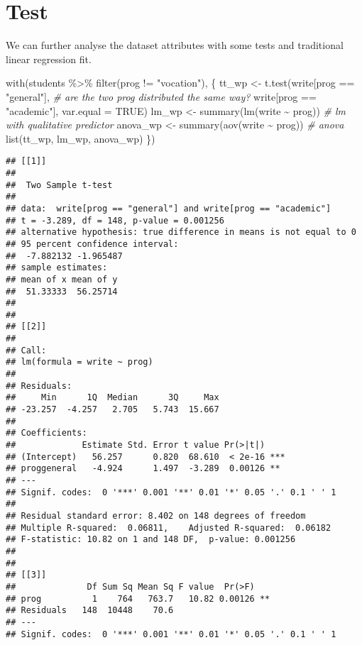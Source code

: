 \documentclass[
  oneside]{book}
\newenvironment{Shaded}{\begin{snugshade}}{\end{snugshade}}
\newcommand{\AttributeTok}[1]{\textcolor[rgb]{0.77,0.63,0.00}{#1}}
\newcommand{\CommentTok}[1]{\textcolor[rgb]{0.56,0.35,0.01}{\textit{#1}}}
\newcommand{\ConstantTok}[1]{\textcolor[rgb]{0.00,0.00,0.00}{#1}}
\newcommand{\FunctionTok}[1]{\textcolor[rgb]{0.00,0.00,0.00}{#1}}
\newcommand{\NormalTok}[1]{#1}
\newcommand{\OtherTok}[1]{\textcolor[rgb]{0.56,0.35,0.01}{#1}}
\newcommand{\SpecialCharTok}[1]{\textcolor[rgb]{0.00,0.00,0.00}{#1}}
\newcommand{\StringTok}[1]{\textcolor[rgb]{0.31,0.60,0.02}{#1}}
\begin{document}
\hypertarget{test}{%
\section{Test}\label{test}}

We can further analyse the dataset attributes with some tests and
traditional linear regression fit.

\begin{Shaded}
\begin{Highlighting}[]
\FunctionTok{with}\NormalTok{(students }\SpecialCharTok{\%\textgreater{}\%} \FunctionTok{filter}\NormalTok{(prog }\SpecialCharTok{!=} \StringTok{"vocation"}\NormalTok{), \{}
\NormalTok{  tt\_wp }\OtherTok{\textless{}{-}} \FunctionTok{t.test}\NormalTok{(write[prog }\SpecialCharTok{==} \StringTok{"general"}\NormalTok{], }\CommentTok{\# are the two prog distributed the same way?}
\NormalTok{         write[prog }\SpecialCharTok{==} \StringTok{"academic"}\NormalTok{], }\AttributeTok{var.equal =} \ConstantTok{TRUE}\NormalTok{)}
\NormalTok{  lm\_wp }\OtherTok{\textless{}{-}} \FunctionTok{summary}\NormalTok{(}\FunctionTok{lm}\NormalTok{(write }\SpecialCharTok{\textasciitilde{}}\NormalTok{ prog)) }\CommentTok{\# lm with qualitative predictor}
\NormalTok{  anova\_wp }\OtherTok{\textless{}{-}} \FunctionTok{summary}\NormalTok{(}\FunctionTok{aov}\NormalTok{(write }\SpecialCharTok{\textasciitilde{}}\NormalTok{ prog)) }\CommentTok{\# anova}
  \FunctionTok{list}\NormalTok{(tt\_wp, lm\_wp, anova\_wp)}
\NormalTok{ \})}
\end{Highlighting}
\end{Shaded}

\begin{verbatim}
## [[1]]
## 
##  Two Sample t-test
## 
## data:  write[prog == "general"] and write[prog == "academic"]
## t = -3.289, df = 148, p-value = 0.001256
## alternative hypothesis: true difference in means is not equal to 0
## 95 percent confidence interval:
##  -7.882132 -1.965487
## sample estimates:
## mean of x mean of y 
##  51.33333  56.25714 
## 
## 
## [[2]]
## 
## Call:
## lm(formula = write ~ prog)
## 
## Residuals:
##     Min      1Q  Median      3Q     Max 
## -23.257  -4.257   2.705   5.743  15.667 
## 
## Coefficients:
##             Estimate Std. Error t value Pr(>|t|)    
## (Intercept)   56.257      0.820  68.610  < 2e-16 ***
## proggeneral   -4.924      1.497  -3.289  0.00126 ** 
## ---
## Signif. codes:  0 '***' 0.001 '**' 0.01 '*' 0.05 '.' 0.1 ' ' 1
## 
## Residual standard error: 8.402 on 148 degrees of freedom
## Multiple R-squared:  0.06811,    Adjusted R-squared:  0.06182 
## F-statistic: 10.82 on 1 and 148 DF,  p-value: 0.001256
## 
## 
## [[3]]
##              Df Sum Sq Mean Sq F value  Pr(>F)   
## prog          1    764   763.7   10.82 0.00126 **
## Residuals   148  10448    70.6                   
## ---
## Signif. codes:  0 '***' 0.001 '**' 0.01 '*' 0.05 '.' 0.1 ' ' 1
\end{verbatim}
\end{document}
